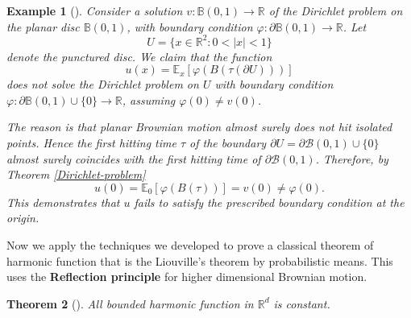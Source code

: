 \documentclass{article}
\numberwithin{equation}{section}
\newtheorem{theorem}{Theorem}[section]
\newtheorem{example}[theorem]{Example}
\begin{document}
\begin{example}
[{\cite[Example 3.15]{PeresMortersBook}}]    
Consider a solution \( v : \mathbb{B}(0,1) \to \mathbb{R} \) of the Dirichlet problem on the planar disc \( \mathbb{B}(0,1) \), with boundary condition \( \varphi : \partial \mathbb{B}(0,1) \to \mathbb{R} \). Let 
\[
U = \{ x \in \mathbb{R}^2 : 0 < |x| < 1 \}
\]
denote the punctured disc. We claim that the function
\[
u(x) = \mathbb{E}_x \left[ \varphi\left( B(\tau(\partial U)) \right) \right]
\]
does not solve the Dirichlet problem on \( U \) with boundary condition \( \varphi : \partial \mathbb{B}(0,1) \cup \{0\} \to \mathbb{R} \), assuming \( \varphi(0) \neq v(0) \). 

\noindent The reason is that planar Brownian motion almost surely does not hit isolated points. Hence the first hitting time \( \tau \) of the boundary \( \partial U = \partial \mathcal{B}(0,1) \cup \{0\} \) almost surely coincides with the first hitting time of \( \partial \mathcal{B}(0,1) \). Therefore, by Theorem \ref{Dirichlet-problem}
\[
u(0) = \mathbb{E}_0 \left[ \varphi\left( B(\tau) \right) \right] = v(0) \neq \varphi(0).
\]
This demonstrates that \( u \) fails to satisfy the prescribed boundary condition at the origin.
\end{example}
\noindent Now we apply the techniques we developed to prove a classical theorem of harmonic function that is the Liouville's theorem by probabilistic means. This uses the \textbf{Reflection principle} for higher dimensional Brownian motion.
\begin{theorem}
[{\cite[Theorem 3.16]{PeresMortersBook}}]
All bounded harmonic function in \(\mathbb{R}^d\) is constant.
\end{theorem}
\end{document}
